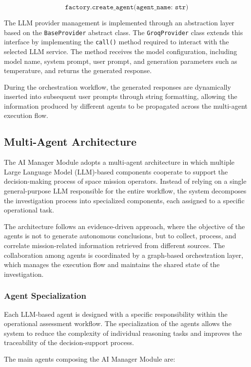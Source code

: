 \[
\texttt{factory.create\_agent(agent\_name: str)}
\]

The LLM provider management is implemented through an abstraction layer based on the \texttt{BaseProvider} abstract class. The \texttt{GroqProvider} class extends this interface by implementing the \texttt{call()} method required to interact with the selected LLM service. The method receives the model configuration, including model name, system prompt, user prompt, and generation parameters such as temperature, and returns the generated response.

During the orchestration workflow, the generated responses are dynamically inserted into subsequent user prompts through string formatting, allowing the information produced by different agents to be propagated across the multi-agent execution flow.

\subsection{Multi-Agent Architecture}

The AI Manager Module adopts a multi-agent architecture in which multiple Large Language Model (LLM)-based components cooperate to support the decision-making process of space mission operators. Instead of relying on a single general-purpose LLM responsible for the entire workflow, the system decomposes the investigation process into specialized components, each assigned to a specific operational task.

The architecture follows an evidence-driven approach, where the objective of the agents is not to generate autonomous conclusions, but to collect, process, and correlate mission-related information retrieved from different sources. The collaboration among agents is coordinated by a graph-based orchestration layer, which manages the execution flow and maintains the shared state of the investigation.

\subsubsection{Agent Specialization}

Each LLM-based agent is designed with a specific responsibility within the operational assessment workflow. The specialization of the agents allows the system to reduce the complexity of individual reasoning tasks and improves the traceability of the decision-support process.

The main agents composing the AI Manager Module are:

